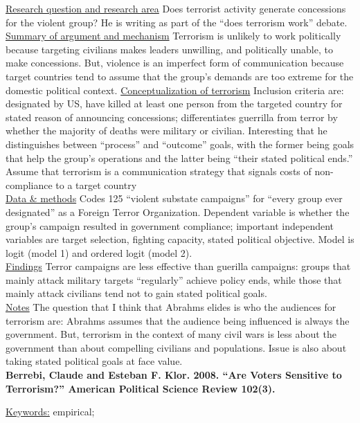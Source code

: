 \documentclass{article}[12pt]
\begin{document}
\underline{Research question and research area} Does terrorist activity generate concessions for the violent group? He is writing as part of the ``does terrorism work'' debate. \\
\underline{Summary of argument and mechanism} Terrorism is unlikely to work politically because targeting civilians makes leaders unwilling, and politically unable, to make concessions. But, violence is an imperfect form of communication because target countries tend to assume that the group's demands are too extreme for the domestic political context.
\underline{Conceptualization of terrorism} Inclusion criteria are: designated by US, have killed at least one person from the targeted country for stated reason of announcing concessions; differentiates guerrilla from terror by whether the majority of deaths were military or civilian. Interesting that he distinguishes between ``process'' and ``outcome'' goals, with the former being goals that help the group's operations and the latter being ``their stated political ends.''  Assume that terrorism is a communication strategy that signals costs of non-compliance to a target country\\
\underline{Data \& methods} Codes 125 ``violent substate campaigns'' for ``every group ever designated'' as a Foreign Terror Organization. Dependent variable is whether the group's campaign resulted in government compliance; important independent variables are target selection, fighting capacity, stated political objective. Model is logit (model 1) and ordered logit (model 2). \\
\underline{Findings} Terror campaigns are less effective than guerilla campaigns: groups that mainly attack military targets ``regularly'' achieve policy ends, while those that mainly attack civilians tend not to gain stated political goals.  \\
\underline{Notes} The question that I think that Abrahms elides is who the audiences for terrorism are: Abrahms assumes that the audience being influenced is always the government. But, terrorism in the context of many civil wars is less about the government than about compelling civilians and populations.  Issue is also about taking stated political goals at face value. \\

\textbf{Berrebi, Claude and Esteban F. Klor. 2008. “Are Voters Sensitive to Terrorism?” American Political Science Review 102(3).}

\underline{Keywords:} empirical; 
\end{document}
